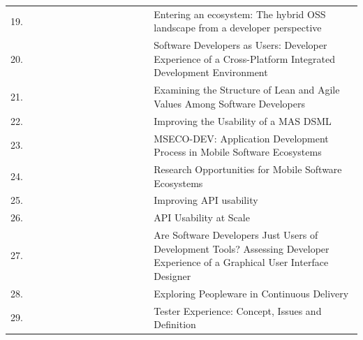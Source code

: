 \documentclass[english, 12pt, a4paper, sci, utf8, a-1b, online]{aaltothesis}
\begin{document}
\begin{center}
\begin{longtable}{p{0.05\linewidth}p{0.35\linewidth}p{0.6\linewidth}}
    19. & \textcite{entering-an-ecosystem}                      & Entering an ecosystem: The hybrid OSS landscape from a developer perspective                                                                \\
    20. & \textcite{software-developers-as-users}               & Software Developers as Users: Developer Experience of a Cross-Platform Integrated Development Environment                                   \\
    21. & \textcite{fagerholm2014examining}                     & Examining the Structure of Lean and Agile Values Among Software Developers                                                                  \\
    22. & \textcite{miranda2018improving}                       & Improving the Usability of a MAS DSML                                                                                                       \\
    23. & \textcite{fontao2016mseco}                            & MSECO-DEV: Application Development Process in Mobile Software Ecosystems                                                                    \\
    24. & \textcite{fontao2015research}                         & Research Opportunities for Mobile Software Ecosystems                                                                                       \\
    25. & \textcite{myers2016improving}                         & Improving API usability                                                                                                                     \\
    26. & \textcite{macvean2016api}                             & API Usability at Scale                                                                                                                      \\
    27. & \textcite{kuusinen2016software}                       & Are Software Developers Just Users of Development Tools? Assessing Developer Experience of a Graphical User Interface Designer              \\
    28. & \textcite{karpanoja2016exploring}                     & Exploring Peopleware in Continuous Delivery                                                                                                 \\
    29. & \textcite{ekwoge2017tester}                           & Tester Experience: Concept, Issues and Definition                                                                                           \\

\end{longtable}
\end{center}
\end{document}
